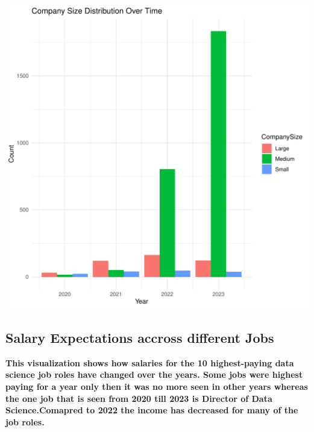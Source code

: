\documentclass{article}\usepackage[]{graphicx}\usepackage[]{xcolor}
\makeatletter
\def\maxwidth{ %
  \ifdim\Gin@nat@width>\linewidth
    \linewidth
  \else
    \Gin@nat@width
  \fi
}
\newenvironment{knitrout}{}{} %
\makeatother
\begin{document}
\begin{knitrout}
\color{fgcolor}
\includegraphics[width=\maxwidth]{figure/unnamed-chunk-6-1} 
\end{knitrout}


\newpage
\subsection{Salary Expectations accross different Jobs}
\textbf{This visualization shows how salaries for the 10 highest-paying data science job roles have changed over the years. Some jobs were highest paying for a year only then it was no more seen in other years whereas the one job that is seen from 2020 till 2023 is Director of Data Science.Comapred to 2022 the income has decreased for many of the job roles.} 
\end{document}
